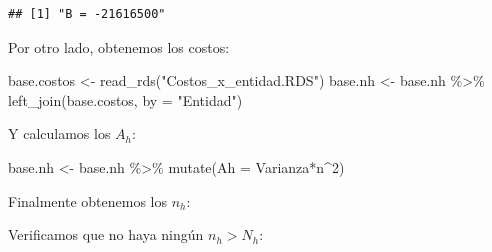 \documentclass[
]{book}
\newenvironment{Shaded}{\begin{snugshade}}{\end{snugshade}}
\newcommand{\AttributeTok}[1]{\textcolor[rgb]{0.77,0.63,0.00}{#1}}
\newcommand{\DecValTok}[1]{\textcolor[rgb]{0.00,0.00,0.81}{#1}}
\newcommand{\FunctionTok}[1]{\textcolor[rgb]{0.00,0.00,0.00}{#1}}
\newcommand{\NormalTok}[1]{#1}
\newcommand{\OtherTok}[1]{\textcolor[rgb]{0.56,0.35,0.01}{#1}}
\newcommand{\SpecialCharTok}[1]{\textcolor[rgb]{0.00,0.00,0.00}{#1}}
\newcommand{\StringTok}[1]{\textcolor[rgb]{0.31,0.60,0.02}{#1}}
\begin{document}
\begin{verbatim}
## [1] "B = -21616500"
\end{verbatim}

Por otro lado, obtenemos los costos:

\begin{Shaded}
\begin{Highlighting}[]
\NormalTok{base.costos }\OtherTok{\textless{}{-}} \FunctionTok{read\_rds}\NormalTok{(}\StringTok{"Costos\_x\_entidad.RDS"}\NormalTok{)}
\NormalTok{base.nh     }\OtherTok{\textless{}{-}}\NormalTok{ base.nh }\SpecialCharTok{\%\textgreater{}\%} \FunctionTok{left\_join}\NormalTok{(base.costos, }\AttributeTok{by =} \StringTok{"Entidad"}\NormalTok{)}
\end{Highlighting}
\end{Shaded}

Y calculamos los \(A_h\):

\begin{Shaded}
\begin{Highlighting}[]
\NormalTok{base.nh }\OtherTok{\textless{}{-}}\NormalTok{ base.nh }\SpecialCharTok{\%\textgreater{}\%} \FunctionTok{mutate}\NormalTok{(}\AttributeTok{Ah =}\NormalTok{ Varianza}\SpecialCharTok{*}\NormalTok{n}\SpecialCharTok{\^{}}\DecValTok{2}\NormalTok{)}
\end{Highlighting}
\end{Shaded}

Finalmente obtenemos los \(n_h\):

\begin{Shaded}
\end{Shaded}

Verificamos que no haya ningún \(n_h > N_h\):
\end{document}
